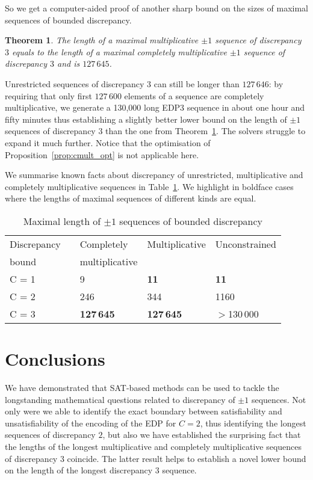 \documentclass{article} \usepackage[utf8]{inputenc}
\newtheorem{theorem}{Theorem}
\begin{document}
So we get a computer-aided proof of another sharp bound on the sizes of maximal
sequences of bounded discrepancy.
\begin{theorem}\label{th:edp3mult}
The length of a maximal multiplicative 
$\pm1$ sequence of discrepancy $3$  equals to 
the length of a maximal completely multiplicative 
$\pm1$ sequence of discrepancy $3$  and is 
$127\,645$.
\end{theorem}
Unrestricted sequences of discrepancy $3$ can still be longer than $127\,646$: by requiring that
only first $127\,600$ elements of a sequence are completely multiplicative, we
generate a 130,000 long EDP3 sequence in about one hour and fifty minutes
thus establishing a slightly better lower bound on the length of 
$\pm1$ sequences of discrepancy $3$ than the one from Theorem~\ref{th:edp3mult}. 
The solvers struggle to expand it much further. Notice that the optimisation of Proposition~\ref{prop:cmult_opt} is not applicable here. 

We summarise known facts about discrepancy of unrestricted, multiplicative and
completely multiplicative sequences in Table~\ref{tab:results}. We highlight in boldface 
cases where the lengths of maximal sequences of different kinds are equal.
\begin{table}[t]\centering
{
\newcommand{\ra}[1]{\renewcommand{\arraystretch}{#1}}
\begin{tabular}{@{}lllll@{}}
\toprule
Discrepancy & & Completely          & Multiplicative    & Unconstrained\\
bound       & & multiplicative      &                   &              \\
\midrule                                                        
C = 1       & & 9                   & \textbf{11}       & \textbf{11}           \\
C = 2       & & 246                 & 344               & 1160         \\ 
C = 3       & & \textbf{127\,645}   & \textbf{127\,645} & $>$130\,000\\ 
\bottomrule
\end{tabular}
}
\caption{Maximal length of $\pm1$ sequences of bounded discrepancy\label{tab:results}}
\end{table}


\section{Conclusions}\label{sec:conclusion}
We have demonstrated that SAT-based methods can be used to tackle the
longstanding mathematical questions related to discrepancy of $\pm 1$ sequences. 
Not only were we able to identify the exact boundary between satisfiability and
unsatisfiability of the encoding of the EDP for $C=2$, thus identifying the
longest sequences of discrepancy $2$, but also we have established the
surprising fact that the lengths of the longest multiplicative and completely
multiplicative sequences of discrepancy $3$ coincide. 
The latter result helps to establish a novel lower bound on the length of the longest
discrepancy $3$ sequence. 
\end{document}

